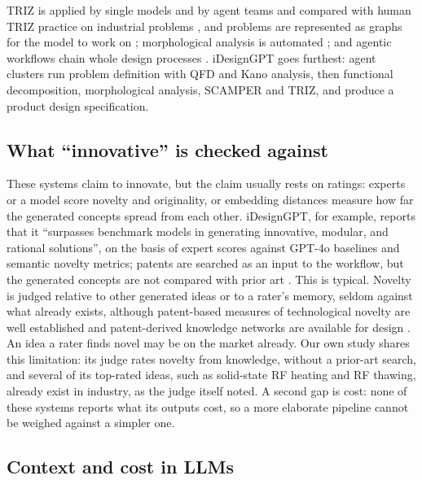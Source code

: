 TRIZ is applied by single models and by agent teams \citep{Chen2024c,Jiang2025,Szczepanik2025,Guo2026} and compared with human TRIZ practice on industrial problems \citep{Livotov2026}, and problems are represented as graphs for the model to work on \citep{Witkowicz2026,Sun2026};
 morphological analysis is automated \citep{Chen2024b}; and agentic workflows chain whole design processes \citep{Ding2023,Massoudi2026}. iDesignGPT \citep{Liu2026} goes furthest: agent clusters run problem definition with QFD and Kano analysis, then functional decomposition, morphological analysis, SCAMPER \citep{Eberle1971} and TRIZ, and produce a product design specification.

\subsection{What ``innovative'' is checked against}\label{what-innovative-is-checked-against}

These systems claim to innovate, but the claim usually rests on ratings: experts or a model score novelty and originality, or embedding distances measure how far the generated concepts spread from each other. iDesignGPT, for example, reports that it ``surpasses benchmark models in generating innovative, modular, and rational solutions'', on the basis of expert scores against GPT-4o baselines and semantic novelty metrics; patents are searched as an input to the workflow, but the generated concepts are not compared with prior art \citep{Liu2026}. This is typical. Novelty is judged relative to other generated ideas or to a rater's memory, seldom against what already exists, although patent-based measures of technological novelty are well established \citep{Fleming2001,Verhoeven2016,Uzzi2013} and patent-derived knowledge networks are available for design \citep{Sarica2020,Luo2021}. An idea a rater finds novel may be on the market already. Our own study shares this limitation: its judge rates novelty from knowledge, without a prior-art search, and several of its top-rated ideas, such as solid-state RF heating and RF thawing, already exist in industry, as the judge itself noted. A second gap is cost: none of these systems reports what its outputs cost, so a more elaborate pipeline cannot be weighed against a simpler one.

\subsection{Context and cost in LLMs}

